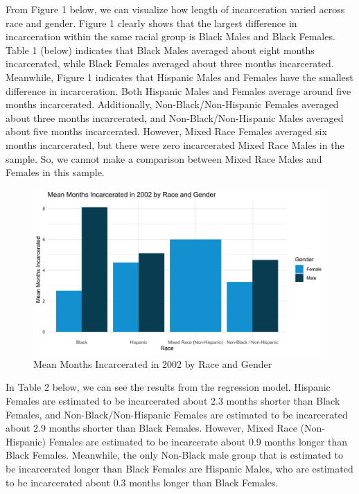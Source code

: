 \documentclass{article}
\begin{document}
From Figure 1 below, we can visualize how length of incarceration varied across race and gender. Figure 1 clearly shows that the largest difference in incarceration within the same racial group is Black Males and Black Females. Table 1 (below) indicates that Black Males averaged about eight months incarcerated, while Black Females averaged about three months incarcerated. Meanwhile, Figure 1 indicates that Hispanic Males and Females have the smallest difference in incarceration. Both Hispanic Males and Females average around five months incarcerated. Additionally, Non-Black/Non-Hispanic Females averaged about three months incarcerated, and Non-Black/Non-Hispanic Males averaged about five months incarcerated. However, Mixed Race Females averaged six months incarcerated, but there were zero incarcerated Mixed Race Males in the sample. So, we cannot make a comparison between Mixed Race Males and Females in this sample. 


\begin{figure}[H]
    \begin{center}
        \includegraphics[width=.85\textwidth]{incarcerations_by_racegender}
    \end{center}
    \caption{Mean Months Incarcerated in 2002 by Race and Gender}
\end{figure}


\newpage

In Table 2 below, we can see the results from the regression model. Hispanic Females are estimated to be incarcerated about 2.3 months shorter than Black Females, and Non-Black/Non-Hispanic Females are estimated to be incarcerated about 2.9 months shorter than Black Females. However, Mixed Race (Non-Hispanic) Females are estimated to be incarcerate about 0.9 months longer than Black Females. 
Meanwhile, the only Non-Black male group that is estimated to be incarcerated longer than Black Females are Hispanic Males, who are estimated to be incarcerated about 0.3 months longer than Black Females. 
\end{document}
